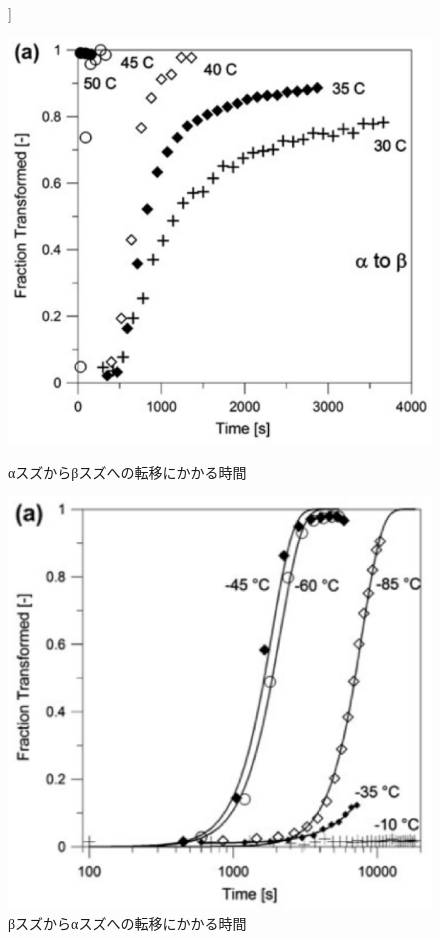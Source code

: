 \begin{figure}[htb]]
 \begin{minipage}{0.5\hsize}
  \begin{center}
   \includegraphics[width=\hsize]{Introduction/alpha-to-beta.eps}
  \end{center}
  \caption{αスズからβスズへの転移にかかる時間}
  \label{fig:alpha-to-beta}
 \end{minipage}
 \begin{minipage}{0.5\hsize}
    \begin{center}
   \includegraphics[width=\hsize]{Introduction/beta-to-alpha.eps}
  \end{center}
  \caption{βスズからαスズへの転移にかかる時間}
  \label{fig:beta-to-alpha}
 \end{minipage}
\end{figure}

